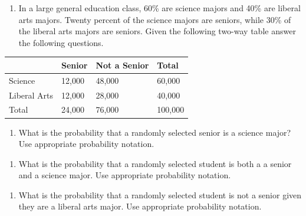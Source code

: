 \documentclass[
]{report}
\providecommand{\tightlist}{%
  \setlength{\itemsep}{0pt}\setlength{\parskip}{0pt}}
\begin{document}
\begin{enumerate}
\def\labelenumi{\arabic{enumi}.}
\tightlist
\item
  In a large general education class, 60\% are science majors and 40\% are liberal arts majors. Twenty percent of the science majors are seniors, while 30\% of the liberal arts majors are seniors. Given the following two-way table answer the following questions.
\end{enumerate}

\begin{longtable}[]{@{}llll@{}}
\toprule
& Senior & Not a Senior & Total \\
\midrule
\endhead
Science & 12,000 & 48,000 & 60,000 \\
Liberal Arts & 12,000 & 28,000 & 40,000 \\
Total & 24,000 & 76,000 & 100,000 \\
\bottomrule
\end{longtable}

\begin{enumerate}
\def\labelenumi{\alph{enumi}.}
\tightlist
\item
  What is the probability that a randomly selected senior is a science major? Use appropriate probability notation.
\end{enumerate}

\vspace{0.35in}

\begin{enumerate}
\def\labelenumi{\alph{enumi}.}
\setcounter{enumi}{1}
\tightlist
\item
  What is the probability that a randomly selected student is both a a senior and a science major. Use appropriate probability notation.
\end{enumerate}

\vspace{0.35in}

\begin{enumerate}
\def\labelenumi{\alph{enumi}.}
\setcounter{enumi}{2}
\tightlist
\item
  What is the probability that a randomly selected student is not a senior given they are a liberal arts major. Use appropriate probability notation.
\end{enumerate}

\vspace{0.35in}
\end{document}
